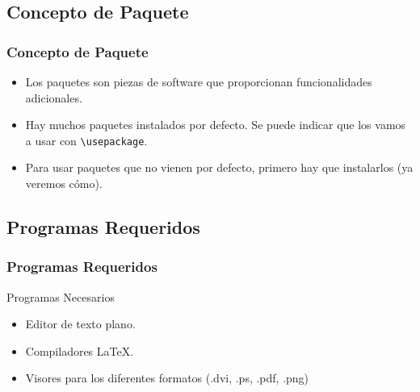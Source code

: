 \documentclass[aspectratio=1610]{beamer}%
\begin{document}
\subsection{Concepto de Paquete}
\begin{frame}[fragile]
\frametitle{\textbf{Concepto de Paquete}}
\justifying
 \begin{itemize}\justifying
  \item Los paquetes son piezas de software que proporcionan funcionalidades adicionales.
  \item Hay muchos paquetes instalados por defecto. Se puede indicar que los vamos a usar con \verb+\usepackage+.
  \item Para usar paquetes que no vienen por defecto, primero hay que instalarlos (ya veremos cómo).
\end{itemize}

\end{frame}

\subsection{Programas Requeridos}
\begin{frame}[fragile]
\frametitle{\textbf{Programas Requeridos}}
\justifying
 \begin{block}{Programas Necesarios}
\begin{itemize}\justifying
  \item Editor de texto plano.
  \item Compiladores \LaTeX{}.
  \item Visores para los diferentes formatos (.dvi, .ps, .pdf, .png)
\end{itemize}

\end{block}
\end{frame}
\end{document}
